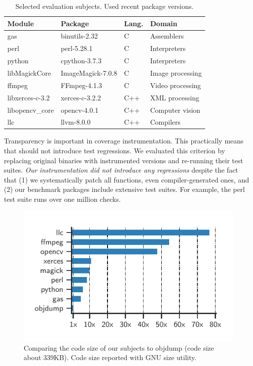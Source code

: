\begin{table}[t!]
	\centering
	\setlength\tabcolsep{4pt}
	\small
	\caption{Selected evaluation subjects. Used recent package versions.}
    \label{tab:selected-benchmarks}    
	\begin{tabularx}{\columnwidth}{@{}llll@{}}
        \\
		\textbf{Module} &
		\textbf{Package} &
		\textbf{Lang.}  &
		\textbf{Domain} \\		
		\toprule
		
		\textsf{gas} & binutils-2.32 & C & Assemblers\\
		\textsf{perl} & perl-5.28.1 & C & Interpreters \\
		\textsf{python} & cpython-3.7.3 & C & Interpreters\\
		\textsf{libMagickCore} & ImageMagick-7.0.8 & C & Image processing\\
		\textsf{ffmpeg} & FFmpeg-4.1.3 & C & Video processing\\
		\textsf{libxerces-c-3.2} & xerces-c-3.2.2 & C++ & XML processing \\
		\textsf{libopencv\_core} & opencv-4.0.1 & C++ & Computer vision\\
		\textsf{llc} & llvm-8.0.0 & C++ & Compilers\\
		\bottomrule
	\end{tabularx}
\end{table}

Transparency is important in coverage instrumentation.
This practically means that {\bcov} should not introduce test regressions.
We evaluated this criterion by replacing original binaries with instrumented versions and re-running their test suites.
\textit{Our instrumentation did not introduce any regressions} despite the fact that (1) we systematically patch all functions, even compiler-generated ones, and (2)
our benchmark packages include extensive test suites.
For example, the \textsf{perl} test suite runs over one million checks.


\begin{figure}[t!]
	\centering
	\includegraphics[clip, trim=0.47cm 0.4cm 0.45cm 0.65cm, width=0.8\columnwidth]{fig/objdump-size-comp}
	\caption{Comparing the code size of our subjects to \textsf{objdump} (code size about 339KB). Code size reported with GNU \textsf{size} utility.}
	\label{fig:code-size-comp}
\end{figure}


